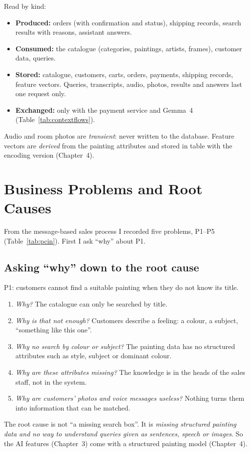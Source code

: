 Read by kind:
\begin{itemize}
\item \textbf{Produced:} orders (with confirmation and status), shipping records, search results with reasons,
      assistant answers.
\item \textbf{Consumed:} the catalogue (categories, paintings, artists, frames), customer data, queries.
\item \textbf{Stored:} catalogue, customers, carts, orders, payments, shipping records, feature vectors. Queries,
      transcripts, audio, photos, results and answers last one request only.
\item \textbf{Exchanged:} only with the payment service and Gemma~4 (Table~\ref{tab:contextflows}).
\end{itemize}
Audio and room photos are \emph{transient}: never written to the database. Feature vectors are \emph{derived} from
the painting attributes and stored in table  with the encoding version (Chapter~4).

\section{Business Problems and Root Causes}\label{sec:1.6}

From the message-based sales process I recorded five problems, P1--P5 (Table~\ref{tab:pcin}). First I ask
``why'' about P1.

\subsection{Asking ``why'' down to the root cause}

P1: customers cannot find a suitable painting when they do not know its title.
\begin{enumerate}
\item \emph{Why?} The catalogue can only be searched by title.
\item \emph{Why is that not enough?} Customers describe a feeling: a colour, a subject, ``something like this
      one''.
\item \emph{Why no search by colour or subject?} The painting data has no structured attributes such as style,
      subject or dominant colour.
\item \emph{Why are these attributes missing?} The knowledge is in the heads of the sales staff, not in the system.
\item \emph{Why are customers' photos and voice messages useless?} Nothing turns them into information that can
      be matched.
\end{enumerate}
The root cause is not ``a missing search box''. It is \emph{missing structured painting data and no way to
understand queries given as sentences, speech or images}. So the AI features (Chapter~3) come with a structured
painting model (Chapter~4).

